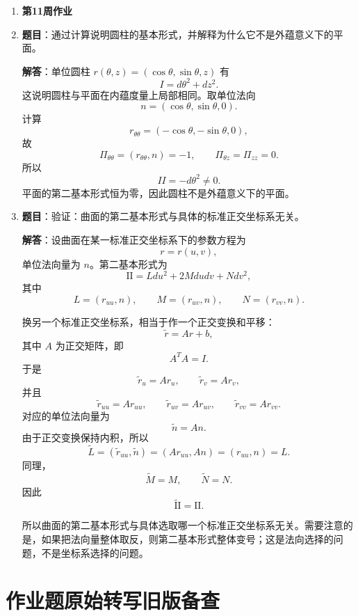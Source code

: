 \documentclass[UTF8,12pt,a4paper]{ctexart}
\newcommand{\norm}[1]{\left\lVert #1\right\rVert}
\newcommand{\inner}[2]{\left(#1,#2\right)}
\newcommand{\homeworkweek}[1]{%
  \item[]\vspace{0.35em}\noindent\textbf{\large #1}\vspace{0.15em}
}
\begin{document}
\begin{enumerate}
\textbf{解答}：大圆是过原点平面与单位球的交线，可写为
\[
r(s)=u\cos s+v\sin s,\qquad \norm u=\norm v=1,\quad u\perp v.
\]
则
\[
r''(s)=-r(s),
\]
加速度完全沿球面法向，切向分量为零，故为测地线。反过来，单位球面测地线满足加速度切向分量为零，故
\[
r''=\lambda r.
\]
又 $\norm r=1$，推出 $\inner{r''}{r}=-\norm{r'}^2$，所以 $r''$ 与 $r$ 平行。于是
\[
{d\over ds}(r\times r')=r\times r''=0.
\]
因此 $r\times r'$ 为常向量，曲线始终位于某个过原点的固定平面内，与球面的交线即大圆。


\homeworkweek{第11周作业}
\item \textbf{题目}：通过计算说明圆柱的基本形式，并解释为什么它不是外蕴意义下的平面。

\textbf{解答}：单位圆柱 $r(\theta,z)=(\cos\theta,\sin\theta,z)$ 有
\[
I=d\theta^2+dz^2.
\]
这说明圆柱与平面在内蕴度量上局部相同。取单位法向
\[
n=(\cos\theta,\sin\theta,0).
\]
计算
\[
r_{\theta\theta}=(-\cos\theta,-\sin\theta,0),
\]
故
\[
\Pi_{\theta\theta}=\inner{r_{\theta\theta}}{n}=-1,\qquad
\Pi_{\theta z}=\Pi_{zz}=0.
\]
所以
\[
II=-d\theta^2\ne0.
\]
平面的第二基本形式恒为零，因此圆柱不是外蕴意义下的平面。

\item \textbf{题目}：验证：曲面的第二基本形式与具体的标准正交坐标系无关。

\textbf{解答}：设曲面在某一标准正交坐标系下的参数方程为
\[
r=r(u,v),
\]
单位法向量为 $n$。第二基本形式为
\[
\mathrm{II}=Ldu^2+2Mdudv+Ndv^2,
\]
其中
\[
L=\inner{r_{uu}}{n},\qquad
M=\inner{r_{uv}}{n},\qquad
N=\inner{r_{vv}}{n}.
\]

换另一个标准正交坐标系，相当于作一个正交变换和平移：
\[
\widetilde r=Ar+b,
\]
其中 $A$ 为正交矩阵，即
\[
A^TA=I.
\]
于是
\[
\widetilde r_u=Ar_u,\qquad
\widetilde r_v=Ar_v,
\]
并且
\[
\widetilde r_{uu}=Ar_{uu},\qquad
\widetilde r_{uv}=Ar_{uv},\qquad
\widetilde r_{vv}=Ar_{vv}.
\]
对应的单位法向量为
\[
\widetilde n=An.
\]
由于正交变换保持内积，所以
\[
\widetilde L
=\inner{\widetilde r_{uu}}{\widetilde n}
=\inner{Ar_{uu}}{An}
=\inner{r_{uu}}{n}
=L.
\]
同理，
\[
\widetilde M=M,\qquad \widetilde N=N.
\]
因此
\[
\boxed{\widetilde{\mathrm{II}}=\mathrm{II}.}
\]

所以曲面的第二基本形式与具体选取哪一个标准正交坐标系无关。需要注意的是，如果把法向量整体取反，则第二基本形式整体变号；这是法向选择的问题，不是坐标系选择的问题。
\end{enumerate}



\iffalse
\section{作业题原始转写旧版备查}
\end{document}
